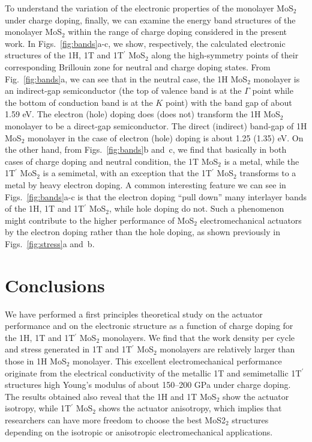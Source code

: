 \documentclass[12pt]{iopart}
\begin{document}
To understand the variation of the electronic properties of the
monolayer MoS$_2$ under charge doping, finally, we can examine the energy band
structures of the monolayer MoS$_2$ within the range of charge doping
considered in the present work. In Figs.~\ref{fig:bands}a-c, we show,
respectively, the calculated electronic structures of the 1H, 1T and
1T$^\prime$ MoS$_2$ along the high-symmetry points of their
corresponding Brillouin zone for neutral and charge doping states.
From Fig.~\ref{fig:bands}a, we can see that in the neutral case, the
1H MoS$_2$ monolayer is an indirect-gap semiconductor (the top of
valence band is at the $\Gamma$ point while the bottom of conduction
band is at the $K$ point) with the band gap of about 1.59 eV.  The
electron (hole) doping does (does not) transform the 1H MoS$_2$
monolayer to be a direct-gap semiconductor.  The direct (indirect)
band-gap of 1H MoS$_2$ monolayer in the case of electron (hole) doping
is about 1.25 (1.35) eV.  On the other hand, from
Figs.~\ref{fig:bands}b and~c, we find that basically in both cases of
charge doping and neutral condition, the 1T MoS$_2$ is a metal, while
the 1T$^\prime$ MoS$_2$ is a semimetal, with an exception that the
1T$^\prime$ MoS$_2$ transforms to a metal by heavy electron doping.  A
common interesting feature we can see in Figs.~\ref{fig:bands}a-c is
that the electron doping ``pull down'' many interlayer bands of the
1H, 1T and 1T$^\prime$ MoS$_2$, while hole doping do not.  Such a
phenomenon might contribute to the higher performance of MoS$_2$
electromechanical actuators by the electron doping rather than the
hole doping, as shown previously in Figs.~\ref{fig:stress}a and~b.

\section{Conclusions}
We have performed a first principles theoretical study on the actuator
performance and on the electronic structure as a function of charge
doping for the 1H, 1T and 1T$^\prime$ MoS$_2$ monolayers. We find that
the work density per cycle and stress generated in 1T and 1T$^\prime$
MoS$_2$ monolayers are relatively larger than those in 1H MoS$_2$
monolayer. This excellent electromechanical performance originate from
the electrical conductivity of the metallic 1T and semimetallic
1T$^\prime$ structures high Young's modulus of about 150--200 GPa
under charge doping.  The results obtained also reveal that the 1H and
1T MoS$_2$ show the actuator isotropy, while 1T$^\prime$ MoS$_2$ shows
the actuator anisotropy, which implies that researchers can have more
freedom to choose the best MoS2$_2$ structures depending on the
isotropic or anisotropic electromechanical applications.
\end{document}
